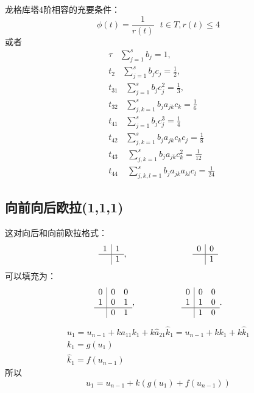 \documentclass[12pt,a4paper]{article}
\begin{document}
龙格库塔4阶相容的充要条件：
\begin{equation*}
\phi(t)=\frac{1}{r(t)} ~~~t\in T,r(t)\le 4
\end{equation*}
或者
\begin{align*}
&\tau~~~~\sum_{j=1}^{s}b_{j}=1,\\
&t_{2}~~~~\sum_{j=1}^{s}b_{j}c_{j}=\frac{1}{2},\\
&t_{31}~~~~\sum_{j=1}^{s}b_{j}c_{j}^2=\frac{1}{3},\\
&t_{32}~~~~\sum_{j,k=1}^{s}b_{j}a_{jk}c_{k}=\frac{1}{6}\\
&t_{41}~~~~\sum_{j=1}^{s}b_{j}c_{j}^3=\frac{1}{4}\\
&t_{42}~~~~\sum_{j,k=1}^{s}b_{j}a_{jk}c_{k}c_{j}=\frac{1}{8}\\
&t_{43}~~~~~\sum_{j,k=1}^{s}b_{j}a_{jk}c_{k}^2=\frac{1}{12}\\
&t_{44}~~~~~\sum_{j,k,l=1}^{s}b_{j}a_{jk}a_{kl}c_{l}=\frac{1}{24}
\end{align*}
\subsection{向前向后欧拉(1,1,1)}

这对向后和向前欧拉格式：
\[
\begin{array}{r|r}
1 & 1 \\
\hline
& 1
\end{array},~~~~~~~~~~~~~~~~~~~~~~~
\begin{array}{r|r}
0 & 0 \\
\hline
& 1 
\end{array}
\]
可以填充为：
\[
\begin{array}{r|rr}
0 & 0 & 0 \\
1 & 0 & 1 \\
\hline
& 0 & 1
\end{array},~~~~~~~~~~~~~~~~
\begin{array}{r|rr}
0 & 0 & 0\\
1 & 1 & 0\\
\hline
& 1 & 0
\end{array}.
\]
\begin{gather*}
u_{1}=u_{n-1}+ka_{11}k_{1}+k\hat{a}_{21}\hat{k}_{1}=u_{n-1}+k k_{1}+k \hat{k}_{1}\\
k_{1}=g(u_{1})\\
\hat{k}_{1}=f(u_{n-1})
\end{gather*}
所以
\begin{equation*}
u_{1}=u_{n-1}+k(g(u_{1})+f(u_{n-1}))
\end{equation*}
\end{document}
